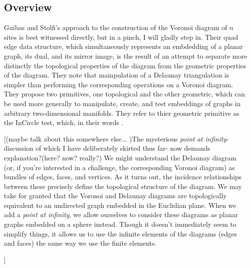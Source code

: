 \documentclass[12pt,twoside]{reedthesis}
\begin{document}
  \subsection{Overview} %
  \label{sub:guibas_stolfi_overview}

  Guibas and Stolfi's approach to the construction of the Voronoi diagram of $n$ sites is best witnessed directly, but in a pinch, I will gladly step in. Their quad edge data structure, which simultaneously represents an embdedding of a planar graph, its dual, and its mirror image, is the result of an attempt to separate more distinctly the topological properties of the diagram from the geometric properties of the diagram. They note that mainpulation of a Delaunay triangulation is simpler than performing the corresponding operations on a Voronoi diagram. They propose two primitives, one topological and the other geometric, which can be used more generally to manipulate, create, and test embeddings of graphs in arbitrary two-dimensional manifolds. They refer to thier geometric primitive as the InCircle test, which, in their words \cite{CITATION}. \par

  [(maybe talk about this somewhere else... )The mysterious \emph{point at infinity}- discussion of which I have deliberately skirted thus far- now demands explanation?(here? now? really?) We might understand the Delaunay diagram (or, if you're interested in a challenge, the corresponding Voronoi diagram) as bundles of edges, faces, and vertices. As it turns out, the incidence relationships between these precisely define the topological structure of the diagram. We may take for granted that the Voronoi and Delaunay diagrams are topologically equivalent to an undirected graph embedded in the Euclidian plane. When we add a \emph{point at infinity}, we allow ourselves to consider these diagrams as planar graphs embedded on a sphere instead. Though it doesn't immediately seem to simplify things, it allows us to use the infinite elements of the diagrams (edges and faces) the same way we use the finite elements. \par]
\end{document}
